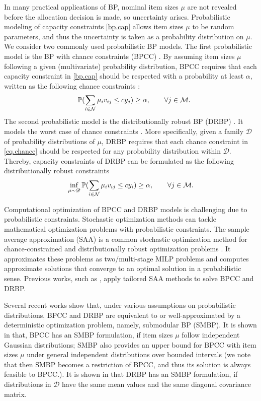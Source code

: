  In many practical applications of BP, nominal item sizes $\mu$ are not revealed before the allocation decision is made, so uncertainty arises.    Probabilistic modeling of  capacity constraints \eqref{bp.cap} allows item sizes $\mu$ to be random parameters, and thus the uncertainty is taken as a probability distribution on $\mu$. We consider  two  commonly used probabilistic BP models.  The first probabilistic model is the BP with chance constraints (BPCC) \citep{song2014chance}. By assuming item sizes $\mu$ following a given (multivariate) probability distribution, BPCC requires that each capacity constraint in \eqref{bp.cap} should be respected with a probability at least $\alpha$, written as the following chance constraints \citep{charnes}:
\begin{equation}
 \label{eq.chance}
      \quad \mathbb{P}(\sum_{i \in \mathcal N} \mu_i v_{ij} \le c{y}_{{j}}) \ge \alpha, \qquad \forall j \in \mathcal M.
	 \end{equation}
 The second probabilistic model is the distributionally robust BP (DRBP) \citep{zhang2020branch,cohen2019overcommitment}. It models the worst case of chance constraints \citep{ghaoui2003}. More specifically, given a family $ \mathscr{D}$ of probability distributions  of $\mu$, DRBP requires that each chance constraint in \eqref{eq.chance} should be respected for any probability distribution within $ \mathscr{D}$. Thereby, capacity constraints of DRBP can be formulated as the following distributionally robust constraints
 \begin{equation}
 \label{eq.chance2}
    \inf_{\mu \sim \mathscr{D}} \mathbb{P}(\sum_{i \in \mathcal N} \mu_i v_{ij} \le c{y}_{{i}}) \ge \alpha,  \qquad \forall j \in \mathcal M.
 \end{equation}
 
 Computational optimization of BPCC and DRBP models is challenging due to probabilistic constraints.  Stochastic optimization methods can tackle mathematical optimization problems with probabilistic constraints. The sample average approximation (SAA) is a common stochastic optimization method for  chance-constrained and distributionally robust optimization problems \citep{luedtke2008sample, bertsimas2018robust}. It approximates these problems as  two/multi-stage MILP problems and computes approximate solutions that converge to an optimal solution in a probabilistic sense. Previous works, such as \cite{zhang2020branch, denton2010optimal,batun2011operating}, apply tailored SAA methods to solve BPCC and DRBP.
 
 Several recent works show that, under various assumptions on probabilistic distributions, BPCC and DRBP are equivalent to or well-approximated by a  deterministic optimization problem, namely, submodular BP (SMBP). It is shown in \cite{cohen2019overcommitment} that, BPCC has an SMBP formulation,   if item sizes $\mu$ follow independent Gaussian distributions;   SMBP also provides an upper bound for BPCC with item sizes $\mu$ under general independent distributions over bounded intervals (we note that then SMBP becomes a restriction of BPCC, and thus its solution is always feasible to BPCC.). It is shown in \cite{zhang2018ambiguous} that DRBP has an SMBP formulation, if distributions in $\mathscr{D}$ have the same mean values and the same diagonal covariance matrix.
 
